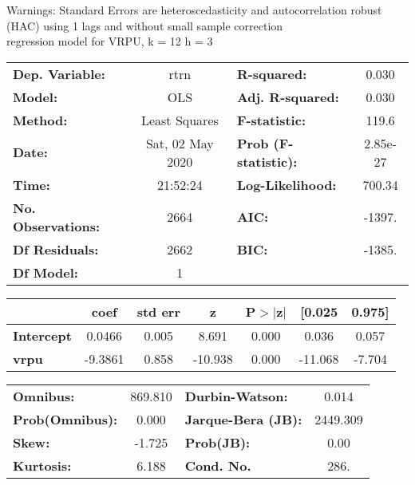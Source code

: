 Warnings: \newline
 [1] Standard Errors are heteroscedasticity and autocorrelation robust (HAC) using 1 lags and without small sample correction\\ 

regression model for VRPU, k = 12 h = 3\begin{center}
\begin{tabular}{lclc}
\toprule
\textbf{Dep. Variable:}    &       rtrn       & \textbf{  R-squared:         } &     0.030   \\
\textbf{Model:}            &       OLS        & \textbf{  Adj. R-squared:    } &     0.030   \\
\textbf{Method:}           &  Least Squares   & \textbf{  F-statistic:       } &     119.6   \\
\textbf{Date:}             & Sat, 02 May 2020 & \textbf{  Prob (F-statistic):} &  2.85e-27   \\
\textbf{Time:}             &     21:52:24     & \textbf{  Log-Likelihood:    } &    700.34   \\
\textbf{No. Observations:} &        2664      & \textbf{  AIC:               } &    -1397.   \\
\textbf{Df Residuals:}     &        2662      & \textbf{  BIC:               } &    -1385.   \\
\textbf{Df Model:}         &           1      & \textbf{                     } &             \\
\bottomrule
\end{tabular}
\begin{tabular}{lcccccc}
                   & \textbf{coef} & \textbf{std err} & \textbf{z} & \textbf{P$> |$z$|$} & \textbf{[0.025} & \textbf{0.975]}  \\
\midrule
\textbf{Intercept} &       0.0466  &        0.005     &     8.691  &         0.000        &        0.036    &        0.057     \\
\textbf{vrpu}      &      -9.3861  &        0.858     &   -10.938  &         0.000        &      -11.068    &       -7.704     \\
\bottomrule
\end{tabular}
\begin{tabular}{lclc}
\textbf{Omnibus:}       & 869.810 & \textbf{  Durbin-Watson:     } &    0.014  \\
\textbf{Prob(Omnibus):} &   0.000 & \textbf{  Jarque-Bera (JB):  } & 2449.309  \\
\textbf{Skew:}          &  -1.725 & \textbf{  Prob(JB):          } &     0.00  \\
\textbf{Kurtosis:}      &   6.188 & \textbf{  Cond. No.          } &     286.  \\
\bottomrule
\end{tabular}
\end{center}

